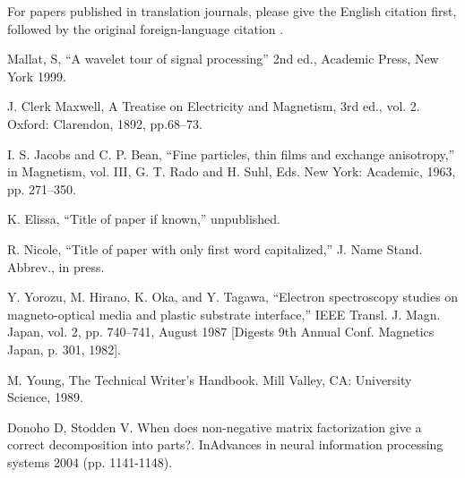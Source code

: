 \documentclass[conference]{IEEEtran}
\begin{document}
For papers published in translation journals, please give the English
citation first, followed by the original foreign-language citation \cite{b6}.

\begin{thebibliography}{00}

 Mallat, S, ``A wavelet tour of signal processing'' 2nd ed., Academic Press, New York 1999.

 J. Clerk Maxwell, A Treatise on Electricity and Magnetism, 3rd ed., vol. 2. Oxford: Clarendon, 1892, pp.68--73.

 I. S. Jacobs and C. P. Bean, ``Fine particles, thin films and exchange anisotropy,'' in Magnetism, vol. III, G. T. Rado and H. Suhl, Eds. New York: Academic, 1963, pp. 271--350.

 K. Elissa, ``Title of paper if known,'' unpublished.

 R. Nicole, ``Title of paper with only first word capitalized,'' J. Name Stand. Abbrev., in press.

 Y. Yorozu, M. Hirano, K. Oka, and Y. Tagawa, ``Electron spectroscopy studies on magneto-optical media and plastic substrate interface,'' IEEE Transl. J. Magn. Japan, vol. 2, pp. 740--741, August 1987 [Digests 9th Annual Conf. Magnetics Japan, p. 301, 1982].

 M. Young, The Technical Writer's Handbook. Mill Valley, CA: University Science, 1989.

 Donoho D, Stodden V. When does non-negative matrix factorization give a correct decomposition into parts?. InAdvances in neural information processing systems 2004 (pp. 1141-1148).

\end{thebibliography}
\vspace{12pt}
\end{document}
